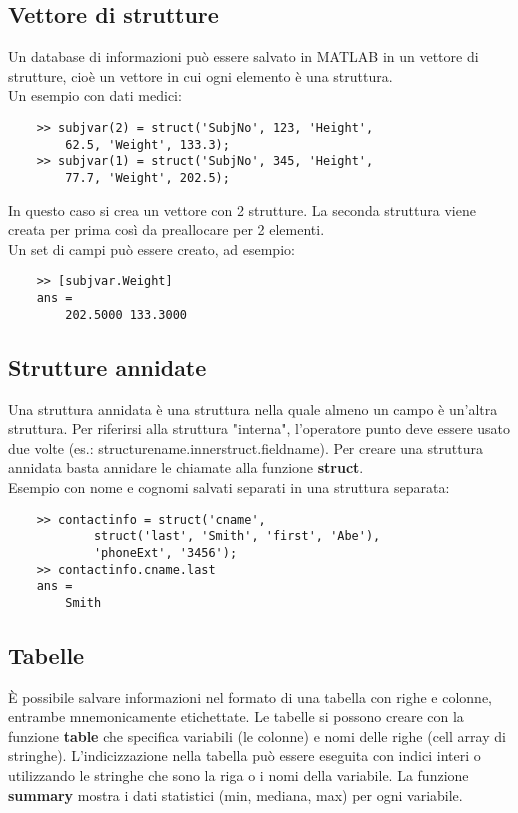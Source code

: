 \documentclass[a4paper, 10pt]{article}
\begin{document}
\subsection{Vettore di strutture}
Un database di informazioni può essere salvato in MATLAB in un vettore di strutture, cioè un vettore in cui ogni elemento è una struttura.\\
Un esempio con dati medici:
\begin{lstlisting}
	>> subjvar(2) = struct('SubjNo', 123, 'Height', 
		62.5, 'Weight', 133.3);
	>> subjvar(1) = struct('SubjNo', 345, 'Height', 
		77.7, 'Weight', 202.5);
\end{lstlisting}
In questo caso si crea un vettore con 2 strutture. La seconda struttura viene creata per prima così da preallocare per 2 elementi.\\
Un set di campi può essere creato, ad esempio:
\begin{lstlisting}
	>> [subjvar.Weight]
	ans =
		202.5000 133.3000
\end{lstlisting}

\subsection{Strutture annidate}
Una struttura annidata è una struttura nella quale almeno un campo è un'altra struttura. Per riferirsi  alla struttura "interna", l'operatore punto deve essere usato due volte (es.: structurename.innerstruct.fieldname).
Per creare una struttura annidata basta annidare le chiamate alla funzione \textbf{struct}.\\
Esempio con nome e cognomi salvati separati in una struttura separata:
\begin{lstlisting}
	>> contactinfo = struct('cname', 
			struct('last', 'Smith', 'first', 'Abe'),
			'phoneExt', '3456');
	>> contactinfo.cname.last
	ans =
		Smith
\end{lstlisting}

\subsection{Tabelle}
È possibile salvare informazioni nel formato di una tabella con righe e colonne, entrambe mnemonicamente etichettate. Le tabelle si possono creare con la funzione \textbf{table} che specifica variabili (le colonne) e nomi delle righe (cell array di stringhe). L'indicizzazione nella tabella può essere eseguita con indici interi o utilizzando le stringhe che sono la riga o i nomi della variabile.
La funzione \textbf{summary} mostra i dati statistici (min, mediana, max) per ogni variabile.
\end{document}
